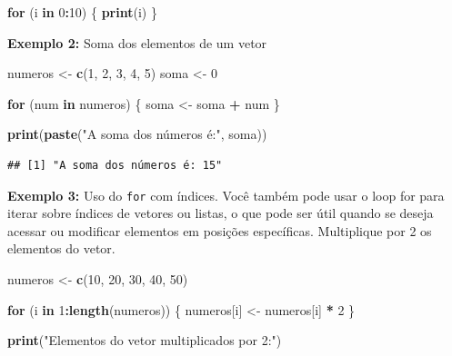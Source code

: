 \documentclass[
]{book}
\newenvironment{Shaded}{\begin{snugshade}}{\end{snugshade}}
\newcommand{\ControlFlowTok}[1]{\textcolor[rgb]{0.13,0.29,0.53}{\textbf{#1}}}
\newcommand{\DecValTok}[1]{\textcolor[rgb]{0.00,0.00,0.81}{#1}}
\newcommand{\FunctionTok}[1]{\textcolor[rgb]{0.13,0.29,0.53}{\textbf{#1}}}
\newcommand{\NormalTok}[1]{#1}
\newcommand{\OtherTok}[1]{\textcolor[rgb]{0.56,0.35,0.01}{#1}}
\newcommand{\SpecialCharTok}[1]{\textcolor[rgb]{0.81,0.36,0.00}{\textbf{#1}}}
\newcommand{\StringTok}[1]{\textcolor[rgb]{0.31,0.60,0.02}{#1}}
\theoremstyle{definition}
\theoremstyle{definition}
\theoremstyle{definition}
\theoremstyle{definition}
\theoremstyle{remark}
\begin{document}
\begin{Shaded}
\begin{Highlighting}[]
\ControlFlowTok{for}\NormalTok{ (i }\ControlFlowTok{in} \DecValTok{0}\SpecialCharTok{:}\DecValTok{10}\NormalTok{) \{}
  \FunctionTok{print}\NormalTok{(i)}
\NormalTok{\}}
\end{Highlighting}
\end{Shaded}

\textbf{Exemplo 2:} Soma dos elementos de um vetor

\begin{Shaded}
\begin{Highlighting}[]
\NormalTok{numeros }\OtherTok{\textless{}{-}} \FunctionTok{c}\NormalTok{(}\DecValTok{1}\NormalTok{, }\DecValTok{2}\NormalTok{, }\DecValTok{3}\NormalTok{, }\DecValTok{4}\NormalTok{, }\DecValTok{5}\NormalTok{)}
\NormalTok{soma }\OtherTok{\textless{}{-}} \DecValTok{0}

\ControlFlowTok{for}\NormalTok{ (num }\ControlFlowTok{in}\NormalTok{ numeros) \{}
\NormalTok{  soma }\OtherTok{\textless{}{-}}\NormalTok{ soma }\SpecialCharTok{+}\NormalTok{ num}
\NormalTok{\}}

\FunctionTok{print}\NormalTok{(}\FunctionTok{paste}\NormalTok{(}\StringTok{"A soma dos números é:"}\NormalTok{, soma))}
\end{Highlighting}
\end{Shaded}

\begin{verbatim}
## [1] "A soma dos números é: 15"
\end{verbatim}

\textbf{Exemplo 3:} Uso do \texttt{for} com índices. Você também pode usar o loop for para iterar sobre índices de vetores ou listas, o que pode ser útil quando se deseja acessar ou modificar elementos em posições específicas. Multiplique por 2 os elementos do vetor.

\begin{Shaded}
\begin{Highlighting}[]
\NormalTok{numeros }\OtherTok{\textless{}{-}} \FunctionTok{c}\NormalTok{(}\DecValTok{10}\NormalTok{, }\DecValTok{20}\NormalTok{, }\DecValTok{30}\NormalTok{, }\DecValTok{40}\NormalTok{, }\DecValTok{50}\NormalTok{)}

\ControlFlowTok{for}\NormalTok{ (i }\ControlFlowTok{in} \DecValTok{1}\SpecialCharTok{:}\FunctionTok{length}\NormalTok{(numeros)) \{}
\NormalTok{  numeros[i] }\OtherTok{\textless{}{-}}\NormalTok{ numeros[i] }\SpecialCharTok{*} \DecValTok{2}
\NormalTok{\}}

\FunctionTok{print}\NormalTok{(}\StringTok{"Elementos do vetor multiplicados por 2:"}\NormalTok{)}
\end{Highlighting}
\end{Shaded}
\end{document}
